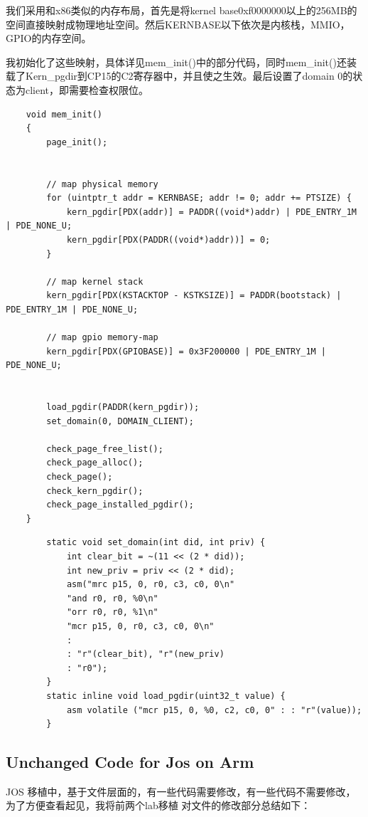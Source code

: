 \documentclass[11pt,a4paper]{article}
\begin{document}
\begin{CJK}{UTF8}{gkai}
	我们采用和x86类似的内存布局，首先是将kernel base0xf0000000以上的256MB的空间直接映射成物理地址空间。然后KERNBASE以下依次是内核栈，MMIO， GPIO的内存空间。
	
	我初始化了这些映射，具体详见mem\_init()中的部分代码，同时mem\_init()还装载了Kern\_pgdir到CP15的C2寄存器中，并且使之生效。最后设置了domain 0的状态为client，即需要检查权限位。
	
	\begin{lstlisting}
	void mem_init()
	{
		page_init();
		
		
		// map physical memory
		for (uintptr_t addr = KERNBASE; addr != 0; addr += PTSIZE) {
			kern_pgdir[PDX(addr)] = PADDR((void*)addr) | PDE_ENTRY_1M | PDE_NONE_U;
			kern_pgdir[PDX(PADDR((void*)addr))] = 0;
		}
		
		// map kernel stack
		kern_pgdir[PDX(KSTACKTOP - KSTKSIZE)] = PADDR(bootstack) | PDE_ENTRY_1M | PDE_NONE_U;
		
		// map gpio memory-map
		kern_pgdir[PDX(GPIOBASE)] = 0x3F200000 | PDE_ENTRY_1M | PDE_NONE_U;
		
		
		load_pgdir(PADDR(kern_pgdir));
		set_domain(0, DOMAIN_CLIENT);
		
		check_page_free_list();
		check_page_alloc();
		check_page();
		check_kern_pgdir();
		check_page_installed_pgdir();
	}
		\end{lstlisting}
		
		\begin{lstlisting}
		static void set_domain(int did, int priv) {
			int clear_bit = ~(11 << (2 * did));
			int new_priv = priv << (2 * did);
			asm("mrc p15, 0, r0, c3, c0, 0\n"
			"and r0, r0, %0\n"
			"orr r0, r0, %1\n"
			"mcr p15, 0, r0, c3, c0, 0\n" 
			: 
			: "r"(clear_bit), "r"(new_priv)
			: "r0");
		}
		static inline void load_pgdir(uint32_t value) {
			asm volatile ("mcr p15, 0, %0, c2, c0, 0" : : "r"(value));
		}
		\end{lstlisting}
		
	\subsection{Unchanged Code for Jos on Arm }
	JOS 移植中，基于文件层面的，有一些代码需要修改，有一些代码不需要修改，为了方便查看起见，我将前两个lab移植 对文件的修改部分总结如下：
			

\end{CJK}
\end{document}
